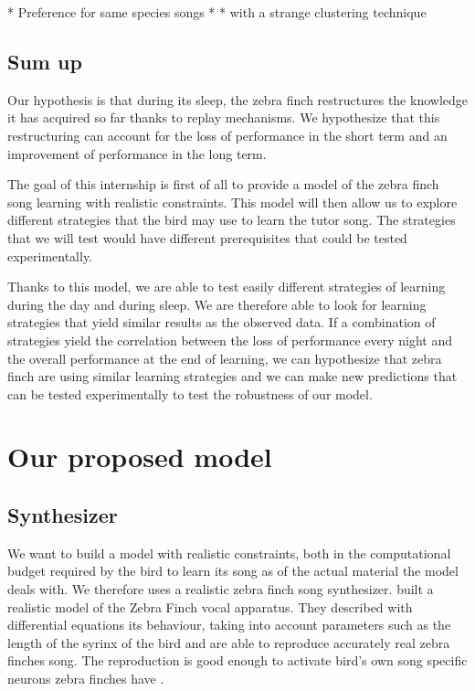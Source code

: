 \documentclass[a4paper]{report}
\begin{document}
* Preference for same species songs \cite{margoliash_evaluating_2002,
marler_three_1997}
* \cite{marler_three_1997}
* \cite{coen_learning_2007} with a strange clustering technique

\section{Sum up}
Our hypothesis is that during its sleep, the zebra finch restructures the
knowledge it has acquired so far thanks to replay mechanisms. We hypothesize
that this restructuring can account for the loss of performance in the short
term and an improvement of performance in the long term.

The goal of this internship is first of all to provide a model of the zebra
finch song learning with realistic constraints. This model will then allow us to
explore different strategies that the bird may use to learn the tutor song. The
strategies that we will test would have different prerequisites that could be
tested experimentally.

Thanks to this model, we are able to test easily different strategies of
learning during the day and during sleep. We are therefore able to look for
learning strategies that yield similar results as the observed data. If a
combination of strategies yield the correlation between the loss of performance
every night and the overall performance at the end of learning, we can
hypothesize that zebra finch are using similar learning strategies and we can
make new predictions that can be tested experimentally to test the robustness
of our model.

\chapter{Our proposed model}

\section{Synthesizer}

We want to build a model with realistic constraints, both in the computational
budget required by the bird to learn its song as of the actual material the
model deals with. We therefore uses a realistic zebra finch song synthesizer.
\textcite{perl_reconstruction_2011} built a realistic model of the Zebra Finch
vocal apparatus. They described with differential equations its behaviour,
taking into account parameters such as the length of the syrinx of the bird
 and are able to reproduce accurately real zebra finches
song. The reproduction is good enough to activate bird's own song specific
neurons zebra finches have \parencite{boari_automatic_2015}.
\end{document}
